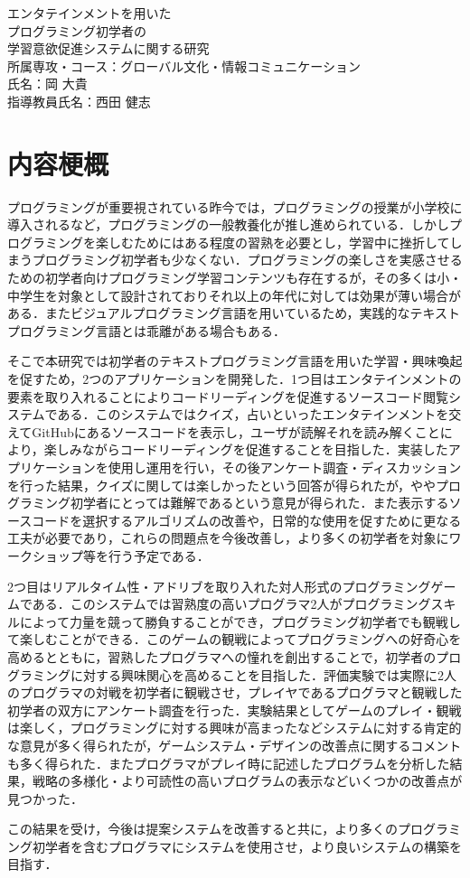 \begin{center}
  {\Large エンタテインメントを用いた\\プログラミング初学者の\\学習意欲促進システムに関する研究}\\
  \vspace{20truept}
    所属専攻・コース：グローバル文化・情報コミュニケーション\\
    氏名：岡 大貴\\
    指導教員氏名：西田 健志\\
\end{center}

\section*{内容梗概}

プログラミングが重要視されている昨今では，プログラミングの授業が小学校に導入されるなど，プログラミングの一般教養化が推し進められている．しかしプログラミングを楽しむためにはある程度の習熟を必要とし，学習中に挫折してしまうプログラミング初学者も少なくない．プログラミングの楽しさを実感させるための初学者向けプログラミング学習コンテンツも存在するが，その多くは小・中学生を対象として設計されておりそれ以上の年代に対しては効果が薄い場合がある．またビジュアルプログラミング言語を用いているため，実践的なテキストプログラミング言語とは乖離がある場合もある．


そこで本研究では初学者のテキストプログラミング言語を用いた学習・興味喚起を促すため，2つのアプリケーションを開発した．1つ目はエンタテインメントの要素を取り入れることによりコードリーディングを促進するソースコード閲覧システムである．このシステムではクイズ，占いといったエンタテインメントを交えてGitHubにあるソースコードを表示し，ユーザが読解それを読み解くことにより，楽しみながらコードリーディングを促進することを目指した．実装したアプリケーションを使用し運用を行い，その後アンケート調査・ディスカッションを行った結果，クイズに関しては楽しかったという回答が得られたが，ややプログラミング初学者にとっては難解であるという意見が得られた．また表示するソースコードを選択するアルゴリズムの改善や，日常的な使用を促すために更なる工夫が必要であり，これらの問題点を今後改善し，より多くの初学者を対象にワークショップ等を行う予定である．


2つ目はリアルタイム性・アドリブを取り入れた対人形式のプログラミングゲームである．このシステムでは習熟度の高いプログラマ2人がプログラミングスキルによって力量を競って勝負することができ，プログラミング初学者でも観戦して楽しむことができる．このゲームの観戦によってプログラミングへの好奇心を高めるとともに，習熟したプログラマへの憧れを創出することで，初学者のプログラミングに対する興味関心を高めることを目指した．評価実験では実際に2人のプログラマの対戦を初学者に観戦させ，プレイヤであるプログラマと観戦した初学者の双方にアンケート調査を行った．実験結果としてゲームのプレイ・観戦は楽しく，プログラミングに対する興味が高まったなどシステムに対する肯定的な意見が多く得られたが，ゲームシステム・デザインの改善点に関するコメントも多く得られた．またプログラマがプレイ時に記述したプログラムを分析した結果，戦略の多様化・より可読性の高いプログラムの表示などいくつかの改善点が見つかった．

この結果を受け，今後は提案システムを改善すると共に，より多くのプログラミング初学者を含むプログラマにシステムを使用させ，より良いシステムの構築を目指す．
